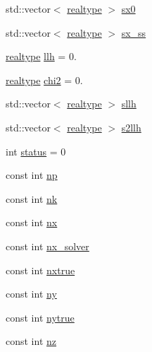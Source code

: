 \begin{DoxyCompactItemize}
\item 
std\+::vector$<$ \mbox{\hyperlink{namespaceamici_a1bdce28051d6a53868f7ccbf5f2c14a3}{realtype}} $>$ \mbox{\hyperlink{classamici_1_1_return_data_a83cf74df5a7fee8ee66f882b898e7b63}{sx0}}
\item 
std\+::vector$<$ \mbox{\hyperlink{namespaceamici_a1bdce28051d6a53868f7ccbf5f2c14a3}{realtype}} $>$ \mbox{\hyperlink{classamici_1_1_return_data_abcaaf6873a0e07199325e7be9da29ec7}{sx\+\_\+ss}}
\item 
\mbox{\hyperlink{namespaceamici_a1bdce28051d6a53868f7ccbf5f2c14a3}{realtype}} \mbox{\hyperlink{classamici_1_1_return_data_a35c3d895b14746807521fa6ba8ead52b}{llh}} = 0.
\item 
\mbox{\hyperlink{namespaceamici_a1bdce28051d6a53868f7ccbf5f2c14a3}{realtype}} \mbox{\hyperlink{classamici_1_1_return_data_a473f438e422f5fbf6c5753a95b3324fe}{chi2}} = 0.
\item 
std\+::vector$<$ \mbox{\hyperlink{namespaceamici_a1bdce28051d6a53868f7ccbf5f2c14a3}{realtype}} $>$ \mbox{\hyperlink{classamici_1_1_return_data_a1696cb94c7712b468ee3e021c6df0c89}{sllh}}
\item 
std\+::vector$<$ \mbox{\hyperlink{namespaceamici_a1bdce28051d6a53868f7ccbf5f2c14a3}{realtype}} $>$ \mbox{\hyperlink{classamici_1_1_return_data_a4087bea95b64c7ecc21bb4c487b255d9}{s2llh}}
\item 
int \mbox{\hyperlink{classamici_1_1_return_data_a6e27f49150e9a14580fb313cc2777e00}{status}} = 0
\item 
const int \mbox{\hyperlink{classamici_1_1_return_data_a72e833f8ef129cac553feb1167223bc3}{np}}
\item 
const int \mbox{\hyperlink{classamici_1_1_return_data_a5e273eaccc1df0343f5a1d4d136f2f2c}{nk}}
\item 
const int \mbox{\hyperlink{classamici_1_1_return_data_a4f88110916f09b2adef33396203ff015}{nx}}
\item 
const int \mbox{\hyperlink{classamici_1_1_return_data_a3a6f34c755e990967cc756b92f406373}{nx\+\_\+solver}}
\item 
const int \mbox{\hyperlink{classamici_1_1_return_data_acf5766cc8560edbdcec5b8ef79459239}{nxtrue}}
\item 
const int \mbox{\hyperlink{classamici_1_1_return_data_a811734e12750524808dba01c57e92c66}{ny}}
\item 
const int \mbox{\hyperlink{classamici_1_1_return_data_a54bcfe56ad0df183516d096adf4e0b26}{nytrue}}
\item 
const int \mbox{\hyperlink{classamici_1_1_return_data_aa406c307f97060d218bc1fe594dfd08f}{nz}}

\end{DoxyCompactItemize}
